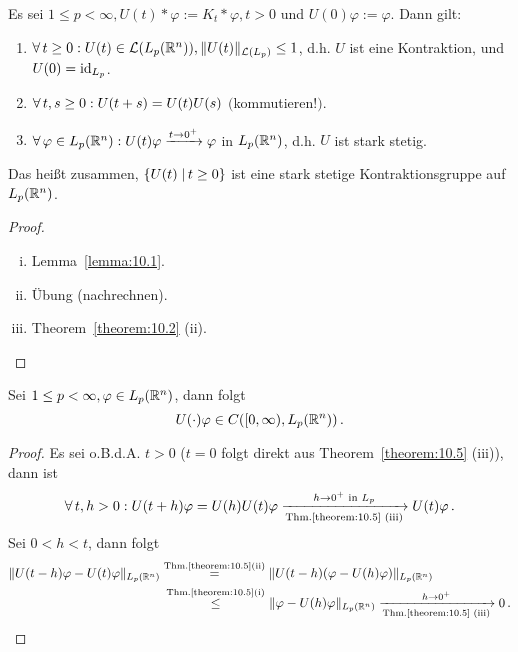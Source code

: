 \begin{theorem}
\label{theorem:10.5}
Es sei $1\leq p < \infty, U(t) \ast \varphi := K_t \ast \varphi , t > 0$ und $U(0)  \varphi:=\varphi$. Dann gilt:
\begin{enumerate}[\rm(i)]
\item $\forall \, t \geq 0 : U(t) \in \mathcal L(L_p(\mathbb{R}^n)), \lVert U(t)\rVert_{\mathcal L(L_p)} \leq 1$, d.h. $U$ ist eine Kontraktion, und $U(0) = \text{id}_{L_p}$.
\item $\forall \, t,s \geq 0: U(t+s) = U(t)U(s)$ $($kommutieren!$)$.
\item $\forall \, \varphi \in L_p(\mathbb{R}^n): U(t) \varphi \xrightarrow{t\rightarrow 0^+} \varphi$ in $L_p(\mathbb{R}^n)$, d.h. $U$ ist stark stetig.
\end{enumerate}
Das heißt zusammen, $\{U(t) \;\vert\, t \geq 0\}$ ist eine stark stetige Kontraktionsgruppe auf $L_p(\mathbb{R}^n)$.
\end{theorem}

\begin{proof}
\begin{enumerate}[(i)]
\item Lemma~\ref{lemma:10.1}.
\item Übung (nachrechnen).
\item Theorem~\ref{theorem:10.2} (ii).\qedhere
\end{enumerate}
\end{proof}

\begin{kor}
\label{kor:10.6}
Sei $1\leq p < \infty, \varphi \in L_p(\mathbb{R}^n)$, dann folgt 
\[
	U(\cdot) \varphi \in C([0,\infty),L_p(\mathbb{R}^n)) \, .
\]
\end{kor}

\begin{proof}
Es sei o.B.d.A. $t > 0$ ($t = 0$ folgt direkt aus Theorem~\ref{theorem:10.5} (iii)), dann ist
\[
	\forall \, t,h > 0 : U(t+h)\varphi = U(h)U(t) \varphi \xrightarrow[\scriptsize\text{Thm.\ref{theorem:10.5} (iii)}]{h \rightarrow 0^+\scriptsize\text{ in } L_p} U(t) \varphi \, .
\]
Sei $0 < h < t$, dann folgt
\begin{align*}
	\lVert U(t-h)\varphi - U(t) \varphi\rVert_{L_p(\mathbb{R}^n)} & \stackrel{\scriptsize\text{Thm.\ref{theorem:10.5}(ii)}}= \lVert U(t-h)(\varphi-U(h) \varphi)\rVert_{L_p(\mathbb{R}^n)} \\
	& \hspace{0.2em} \stackrel{\scriptsize\text{Thm.\ref{theorem:10.5}(i)}}\leq\hspace{0.05em} \lVert \varphi-U(h) \varphi\rVert_{L_p (\mathbb{R}^n)} \xrightarrow[\scriptsize\text{Thm.\ref{theorem:10.5} (iii)}]{h \rightarrow 0^+} 0\, .
\end{align*}
\end{proof}

